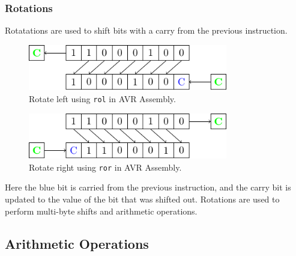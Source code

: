 \documentclass{article}
\begin{document}
\subsubsection{Rotations}
Rotatations are used to shift bits with a carry from the previous instruction.
\begin{figure}[H]
    \centering
    \includegraphics[height = 2cm, keepaspectratio = true]{figures/rotate_left.pdf}
    \caption{Rotate left using \texttt{rol} in AVR Assembly.} %
\end{figure}
\begin{figure}[H]
    \centering
    \includegraphics[height = 2cm, keepaspectratio = true]{figures/rotate_right.pdf}
    \caption{Rotate right using \texttt{ror} in AVR Assembly.} %
\end{figure}
Here the blue bit is carried from the previous instruction, and the carry bit is updated
to the value of the bit that was shifted out.
Rotations are used to perform multi-byte shifts and arithmetic operations.
\subsection{Arithmetic Operations}
\end{document}
